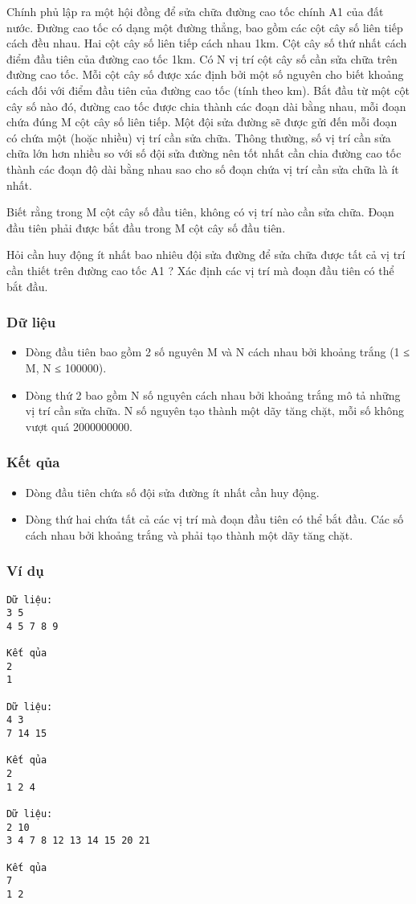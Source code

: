 



   Chính phủ lập ra một hội đồng để sửa chữa đường cao tốc chính       A1      của đất nước. Đường cao tốc có dạng một đường thẳng, bao gồm các cột cây số liên tiếp cách đều nhau. Hai cột cây số liên   tiếp cách nhau 1km. Cột cây số thứ nhất cách điểm đầu tiên của đường cao tốc 1km. Có N vị trí cột cây số cần sửa chữa trên đường cao tốc. Mỗi cột cây số được xác định bởi một số nguyên cho biết   khoảng cách đối với điểm đầu tiên của đường cao tốc (tính theo km). Bắt đầu từ một cột cây số nào đó, đường cao tốc được chia thành các đoạn dài bằng nhau, mỗi đoạn chứa đúng M cột cây số liên tiếp.   Một đội sửa đường sẽ được gửi đến mỗi đoạn có chứa một (hoặc nhiều) vị trí cần sửa chữa. Thông thường, số vị trí cần sửa chữa lớn hơn nhiều so với số đội sửa đường nên tốt nhất cần chia đường cao tốc   thành các đoạn độ dài bằng nhau sao cho số đoạn chứa vị trí cần sửa chữa là ít nhất.  

   Biết rằng trong M cột cây số đầu tiên, không có vị trí nào cần sửa chữa. Đoạn đầu tiên phải được bắt đầu trong M cột cây số đầu tiên.  

   Hỏi cần huy động ít nhất bao nhiêu đội sửa đường để sửa chữa được tất cả vị trí cần thiết trên đường cao tốc       A1      ? Xác định các vị trí mà đoạn đầu tiên có thể bắt đầu.  

\subsubsection{   Dữ liệu  }
\begin{itemize}
	\item     Dòng đầu tiên bao gồm 2 số nguyên M và N cách nhau bởi khoảng trắng (1 ≤ M, N ≤ 100000).   
	\item     Dòng thứ 2 bao gồm N số nguyên cách nhau bởi khoảng trắng mô tả những vị trí cần sửa chữa. N số nguyên tạo thành một dãy tăng chặt, mỗi số không vượt quá 2000000000.   
\end{itemize}

\subsubsection{   Kết qủa  }
\begin{itemize}
	\item     Dòng đầu tiên chứa số đội sửa đường ít nhất cần huy động.   
	\item     Dòng thứ hai chứa tất cả các vị trí mà đoạn đầu tiên có thể bắt đầu. Các số cách nhau bởi khoảng trắng và phải tạo thành một dãy tăng chặt.   
\end{itemize}

\subsubsection{   Ví dụ  }
\begin{verbatim}
Dữ liệu:
3 5
4 5 7 8 9

Kết qủa
2 
1

Dữ liệu:
4 3
7 14 15

Kết qủa
2
1 2 4

Dữ liệu:
2 10
3 4 7 8 12 13 14 15 20 21

Kết qủa
7
1 2
\end{verbatim}